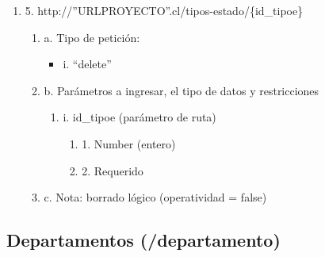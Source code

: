 \begin{enumerate}
    \item 5. http://”URLPROYECTO”.cl/tipos-estado/\{id\_tipoe\}
    \begin{enumerate}
        \item a. Tipo de petición:
            \begin{itemize}
               \item i. “delete”
            \end{itemize}
        \item b. Parámetros a ingresar, el tipo de datos y restricciones
            \begin{enumerate}
                \item i. id\_tipoe (parámetro de ruta)
                    \begin{enumerate}
                        \item 1. Number (entero)
                        \item 2. Requerido
                    \end{enumerate}
            \end{enumerate}
        \item c. Nota: borrado lógico (operatividad = false)
    \end{enumerate}
\end{enumerate}

\subsection{Departamentos (/departamento)}

